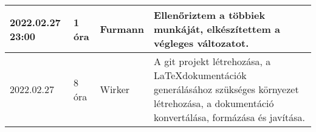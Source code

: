 \begin{tabularx}{\textwidth}{|p{2cm}|l|l|X|}
	\hline
	2022.02.27 23:00  & 1 óra     & Furmann    & Ellenőriztem a többiek munkáját, elkészítettem a végleges változatot.                                                                                                                                                                                                                                                                                                                                                                                                                                                                                                                                                                          \\
	\hline
	2022.02.27 & 8 óra & Wirker & A git projekt létrehozása, a \LaTeX\hspace{0.5em}dokumentációk generálásához szükséges környezet létrehozása, a dokumentáció konvertálása, formázása és javítása. \\
	\hline
\end{tabularx}

